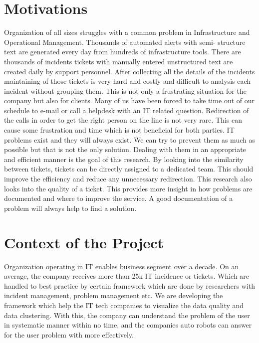 \documentclass[a4paper,12pt]{report}
\begin{document}
    \section{Motivations}
    Organization of all sizes struggles with a common problem in Infrastructure and Operational Management. Thousands of automated alerts with semi- structure text are generated every day from hundreds of infrastructure tools. There are thousands of incidents tickets with manually entered unstructured text are created daily by support personnel. After collecting all the details of the incidents maintaining of those tickets is very hard and costly and difficult to analysis each incident without grouping them. This is not only a frustrating situation for the company but also for clients. 
    \newline\newline
    Many of us have been forced to take time out of our schedule to e-mail or call a helpdesk with an IT related question. Redirection of the calls in order to get the right person on the line is not very rare. This can cause some frustration and time which is not beneficial for both parties. 
    \newline\newline
    IT problems exist and they will always exist. We can try to prevent them as much as possible but that is not the only solution. Dealing with them in an appropriate and efficient manner is the goal of this research. By looking into the similarity between tickets, tickets can be directly assigned to a dedicated team. This should improve the efficiency and reduce any unnecessary redirection. This research also looks into the quality of a ticket. This provides more insight in how problems are documented and where to improve the service. A good documentation of a problem will always help to find a solution. 



    \section{Context of the Project}
    Organization operating in IT enables business segment over a decade. On an average, the company receives more than 25k IT incidence or tickets. Which are handled to best practice by certain framework which are done by researchers with incident management, problem management etc. 
    \newline\newline
    We are developing the framework which help the IT tech companies to visualize the data quality and data clustering. With this, the company can understand the problem of the user in systematic manner within no time, and the companies  auto robots can answer for the user  problem with more effectively.
    
\end{document}
